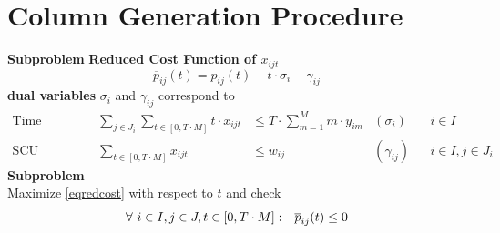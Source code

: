 \documentclass[xcolor=dvipsnames,aspectratio=169, handout, mathserif]{beamer}
\begin{document}
\section{Column Generation Procedure}


\begin{frame}{\textbf{Subproblem}}
\textbf{Reduced Cost Function of $x_{ijt}$}
\begin{equation}\label{eqredcost}
\overline{p}_{ij}(t) =  p_{ij}(t) -  t \cdot \sigma_i  - \gamma_{ij}
\end{equation}
\textbf{dual variables} $\sigma_{i}$ and $\gamma_{ij}$ correspond to
\begin{align*}
\text{Time Allocation} &&   \sum_{ j \in J_i} \sum_{t\in [0,T \cdot M]} t \cdot x_{ijt}  & \leq T \cdot \sum_{m = 1}^M m \cdot y_{im}   & \left(\sigma_{i}\right)&& i \in I \\
\text{SCU Assignment} &&   \sum_{t \in \left[0,T \cdot M \right]}x_{ijt} & \leq w_{ij}  & \left(\gamma_{ij}\right)&& i \in I, j \in J_i 
\end{align*}
\textbf{{Subproblem}}\\
Maximize \eqref{eqredcost} with respect to $t$ and check 
\begin{equation} \label{sfd-pricing}
\forall \ i \in I, j \in J, t \in [0,T \cdot M]: \hspace{0.25cm} 
\overline{p}_{ij}(t) \le 0  
\end{equation}
\end{frame}
\end{document}
